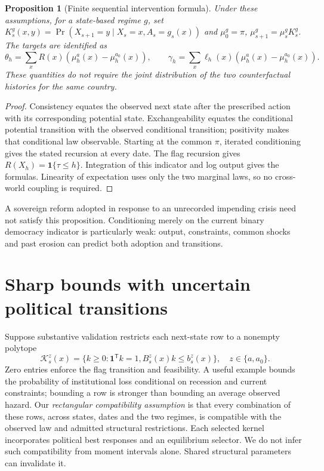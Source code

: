 \documentclass[11pt]{article}
\newtheorem{proposition}[theorem]{Proposition}
\newcommand{\Ind}{\mathbf 1}
\begin{document}
\begin{proposition}[Finite sequential intervention formula]\label{gf}
Under these assumptions, for a state-based regime $g$, set
$K_s^g(x,y)=\Pr(X_{s+1}=y\mid X_s=x,A_s=g_s(x))$ and
$\mu_0^g=\pi$, $\mu_{s+1}^g=\mu_s^gK_s^g$. The targets are identified as
\[
 \theta_h=\sum_x R(x)(\mu_h^a(x)-\mu_h^{a_0}(x)),\qquad
 \gamma_h=\sum_x\ell_h(x)(\mu_h^a(x)-\mu_h^{a_0}(x)).
\]
These quantities do not require the joint distribution of the two
counterfactual histories for the same country.
\end{proposition}
\begin{proof}
Consistency equates the observed next state after the prescribed action
with its corresponding potential state. Exchangeability equates the
conditional potential transition with the observed conditional transition;
positivity makes that conditional law observable. Starting at the common
$\pi$, iterated conditioning gives the stated recursion at every date.
The flag recursion gives $R(X_h)=\Ind\{\tau\leq h\}$. Integration of
this indicator and log output gives the formulas. Linearity of expectation
uses only the two marginal laws, so no cross-world coupling is required.
\end{proof}

A sovereign reform adopted in response to an unrecorded impending crisis
need not satisfy this proposition. Conditioning merely on the current
binary democracy indicator is particularly weak: output, constraints,
common shocks and past erosion can predict both adoption and transitions.

\section{Sharp bounds with uncertain political transitions}
Suppose substantive validation restricts each next-state row to a
nonempty polytope
\[
 \mathcal K_s^z(x)=\{k\geq0:\boldsymbol1^\mathsf T k=1,
                  B_s^z(x)k\leq b_s^z(x)\},\quad z\in\{a,a_0\}.
\]
Zero entries enforce the flag transition and feasibility. A useful example
bounds the probability of institutional loss conditional on recession and
current constraints; bounding a row is stronger than bounding an average
observed hazard. Our \emph{rectangular compatibility assumption} is that
every combination of these rows, across states, dates and the two regimes,
is compatible with the observed law and admitted structural restrictions.
Each selected kernel incorporates political best responses and an
equilibrium selector. We do not infer such compatibility from moment
intervals alone. Shared structural parameters can invalidate it.
\end{document}
